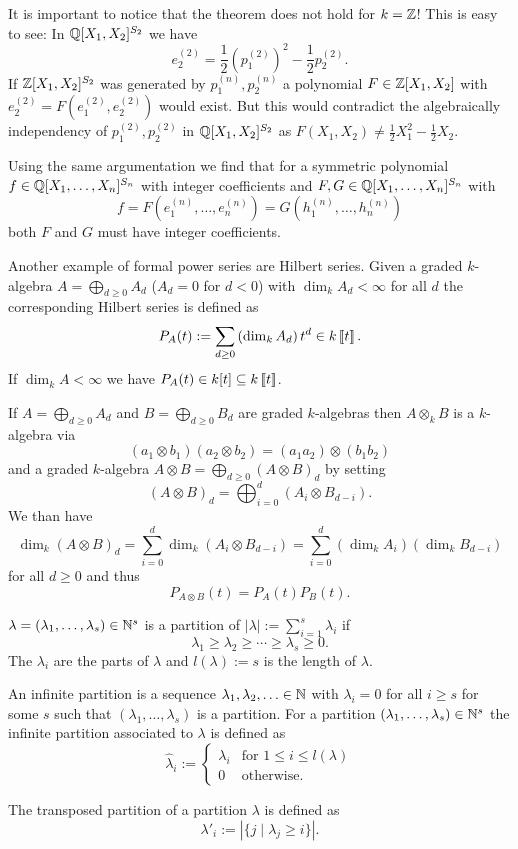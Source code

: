 It is important to notice that the theorem does not hold for $k = \mathbb{Z}$! This is easy to see: In $\mathbb{Q}[X_1, X_2]^{S_2}$ we have
\[
 e^{(2)}_2 = \frac{1}{2}\left(p^{(2)}_1\right)^2 - \frac{1}{2} p^{(2)}_2.
\]
If $\mathbb{Z}[X_1, X_2]^{S_2}$ was generated by $p^{(n)}_1, p^{(n)}_2$ a polynomial $F \in \mathbb{Z}[X_1, X_2]$ with $e^{(2)}_2 = F\left(e^{(2)}_1, e^{(2)}_2\right)$ would exist. But this would contradict the algebraically independency of $p^{(2)}_1, p^{(2)}_2$ in $\mathbb{Q}[X_1, X_2]^{S_2}$ as $F(X_1, X_2) \neq \frac{1}{2} X_1^2 - \frac{1}{2} X_2$.


Using the same argumentation we find that for a symmetric polynomial $f \in \mathbb{Q}[X_1, \dotsc, X_n]^{S_n}$ with integer coefficients and $F,G \in \mathbb{Q}[X_1, \dotsc, X_n]^{S_n}$ with
\[
 f = F\left( e^{(n)}_1, \dotsc, e^{(n)}_n \right) = G\left( h^{(n)}_1, \dotsc, h^{(n)}_n\right)
\]
both $F$ and $G$ must have integer coefficients.


\begin{expl}
 Another example of formal power series are Hilbert series. Given a graded $k$-algebra $A = \bigoplus_{d \geq 0} A_d$ ($A_d = 0$ for $d < 0$) with $\dim_k A_d < \infty$ for all $d$ the corresponding Hilbert series is defined as
 \[
  P_A(t) := \sum_{d \geq 0} \left( \dim_k A_d \right) t^d \in k\left[\!\left[t\right]\!\right].
 \]
 If $\dim_k A < \infty$ we have $P_A(t) \in k[t] \subseteq k\left[\!\left[t\right]\!\right]$.
 
 If $A = \bigoplus_{d \geq 0} A_d$ and $B = \bigoplus_{d \geq 0} B_d$ are graded $k$-algebras then $A \otimes_k B$ is a $k$-algebra via
 \[
  (a_1 \otimes b_1) (a_2 \otimes b_2) = (a_1 a_2) \otimes (b_1 b_2)
 \]
 and a graded $k$-algebra $A \otimes B = \bigoplus_{d \geq 0} (A \otimes B)_d$ by setting
 \[
  (A \otimes B)_d = \bigoplus_{i=0}^d (A_i \otimes B_{d-i}).
 \]
 We than have
 \[
  \dim_k (A \otimes B)_d = \sum_{i=0}^d \dim_k (A_i \otimes B_{d-i}) = \sum_{i=0}^d (\dim_k A_i) (\dim_k B_{d-i})
 \]
 for all $d \geq 0$ and thus
 \[
  P_{A \otimes B}(t) = P_A(t) P_B(t).
 \]
\end{expl}



\begin{defi}
 $\lambda = (\lambda_1, \dotsc, \lambda_s) \in \mathbb{N}^s$ is a partition of $|\lambda| := \sum_{i=1}^s \lambda_i$ if
 \[
  \lambda_1 \geq \lambda_2 \geq \dotsb \geq \lambda_s \geq 0.
 \]
 The $\lambda_i$ are the parts of $\lambda$ and $l(\lambda) := s$ is the length of  $\lambda$.
 
 An infinite partition is a sequence $\lambda_1, \lambda_2, \dotsc \in \mathbb{N}$ with $\lambda_i = 0$ for all $i \geq s$ for some $s$ such that $(\lambda_1, \dotsc, \lambda_s)$ is a partition. For a partition $(\lambda_1, \dotsc, \lambda_s) \in \mathbb{N}^s$ the infinite partition associated to $\lambda$ is defined as
 \[
  \hat{\lambda}_i :=
  \begin{cases}
   \lambda_i & \text{for } 1 \leq i \leq l(\lambda) \\
           0 & \text{otherwise}.
  \end{cases}
 \]
 
 The transposed partition of a partition $\lambda$ is defined as
 \[
  \lambda'_i := |\{j \mid \lambda_j \geq i\}|.
 \]
\end{defi}

